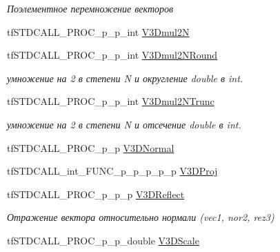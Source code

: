 \begin{DoxyCompactItemize}
\begin{DoxyCompactList}\small\item\em Поэлементное перемножение векторов \end{DoxyCompactList}\item 
tf\-S\-T\-D\-C\-A\-L\-L\-\_\-\-P\-R\-O\-C\-\_\-p\-\_\-p\-\_\-int \hyperlink{structs_functions_vector_c_p_u_afef5cbbbf6085b034472266077569966}{V3\-Dmul2\-N}
\item 
\hypertarget{structs_functions_vector_c_p_u_a133fb5569f5c736a579a493a15289cc0}{tf\-S\-T\-D\-C\-A\-L\-L\-\_\-\-P\-R\-O\-C\-\_\-p\-\_\-p\-\_\-int \hyperlink{structs_functions_vector_c_p_u_a133fb5569f5c736a579a493a15289cc0}{V3\-Dmul2\-N\-Round}}\label{structs_functions_vector_c_p_u_a133fb5569f5c736a579a493a15289cc0}

\begin{DoxyCompactList}\small\item\em умножение на 2 в степени N и округление double в int. \end{DoxyCompactList}\item 
\hypertarget{structs_functions_vector_c_p_u_ac58997a00dac4b73279800208d739830}{tf\-S\-T\-D\-C\-A\-L\-L\-\_\-\-P\-R\-O\-C\-\_\-p\-\_\-p\-\_\-int \hyperlink{structs_functions_vector_c_p_u_ac58997a00dac4b73279800208d739830}{V3\-Dmul2\-N\-Trunc}}\label{structs_functions_vector_c_p_u_ac58997a00dac4b73279800208d739830}

\begin{DoxyCompactList}\small\item\em умножение на 2 в степени N и отсечение double в int. \end{DoxyCompactList}\item 
tf\-S\-T\-D\-C\-A\-L\-L\-\_\-\-P\-R\-O\-C\-\_\-p\-\_\-p \hyperlink{structs_functions_vector_c_p_u_a1ad560edcff91be9d51e9d8907122c0c}{V3\-D\-Normal}
\item 
tf\-S\-T\-D\-C\-A\-L\-L\-\_\-int\-\_\-\-F\-U\-N\-C\-\_\-p\-\_\-p\-\_\-p\-\_\-p\-\_\-p \hyperlink{structs_functions_vector_c_p_u_aa6a2f83083b1a4f76b64f9a6f677a5ef}{V3\-D\-Proj}
\item 
\hypertarget{structs_functions_vector_c_p_u_a2c68c16e17f1972c607f403318c06c7a}{tf\-S\-T\-D\-C\-A\-L\-L\-\_\-\-P\-R\-O\-C\-\_\-p\-\_\-p\-\_\-p \hyperlink{structs_functions_vector_c_p_u_a2c68c16e17f1972c607f403318c06c7a}{V3\-D\-Reflect}}\label{structs_functions_vector_c_p_u_a2c68c16e17f1972c607f403318c06c7a}

\begin{DoxyCompactList}\small\item\em Отражение вектора относительно нормали (vec1, nor2, rez3) \end{DoxyCompactList}\item 
\hypertarget{structs_functions_vector_c_p_u_a3ac2d48faf6e251573a844da85f545ab}{tf\-S\-T\-D\-C\-A\-L\-L\-\_\-\-P\-R\-O\-C\-\_\-p\-\_\-p\-\_\-double \hyperlink{structs_functions_vector_c_p_u_a3ac2d48faf6e251573a844da85f545ab}{V3\-D\-Scale}}\label{structs_functions_vector_c_p_u_a3ac2d48faf6e251573a844da85f545ab}


\end{DoxyCompactItemize}
